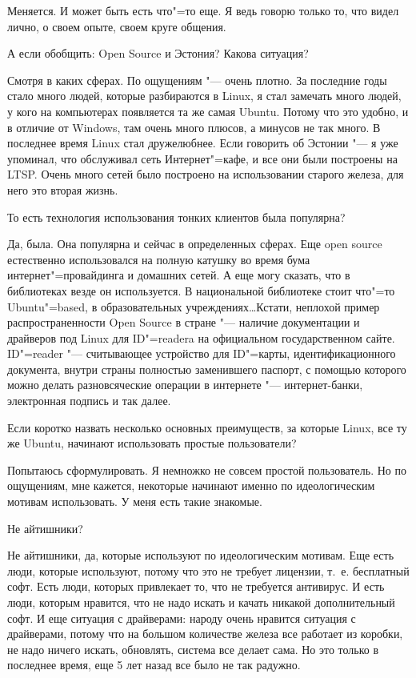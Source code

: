 \documentclass[10pt, a5paper]{article}
\begin{document}
\a Меняется. И может быть есть что"=то еще. Я ведь говорю только то, что видел лично, о своем опыте, своем круге общения.

\q А если обобщить: Open Source и Эстония? Какова ситуация?

\a Смотря в каких сферах. По ощущениям "--- очень плотно. За последние годы стало много людей, которые разбираются в Linux, я стал замечать много людей, у кого на компьютерах появляется та же самая Ubuntu. Потому что это удобно, и в отличие от Windows, там очень много плюсов, а минусов не так много. В последнее время Linux стал дружелюбнее. Если говорить об Эстонии "--- я уже упоминал, что обслуживал сеть Интернет"=кафе, и все они были построены на LTSP. Очень много сетей было построено на использовании старого железа, для него это вторая жизнь. 

\q То есть технология использования тонких клиентов была популярна?

\a Да, была. Она популярна и сейчас в определенных сферах. Еще open source естественно использовался на полную катушку во время бума интернет"=провайдинга и домашних сетей. А еще могу сказать, что в библиотеках везде он используется. В национальной библиотеке стоит что"=то Ubuntu"=based, в образовательных учреждениях\ldots Кстати, неплохой пример распространенности Open Source в стране "--- наличие документации и драйверов под Linux для ID"=readera на официальном государственном сайте. ID"=reader "--- считывающее устройство для ID"=карты, идентификационного документа, внутри страны полностью заменившего паспорт, с помощью которого можно делать разновсяческие операции в интернете "--- интернет-банки, электронная подпись и так далее.

\q Если коротко назвать несколько основных преимуществ, за которые Linux, все ту же Ubuntu, начинают использовать простые пользователи?

\a Попытаюсь сформулировать. Я немножко не совсем простой пользователь. Но по ощущениям, мне кажется, некоторые начинают именно по идеологическим мотивам использовать. У меня есть такие знакомые.

\q Не айтишники?

\a Не айтишники, да, которые используют по идеологическим мотивам. Еще есть люди, которые используют, потому что это не требует лицензии, т.~е. бесплатный софт. Есть люди, которых привлекает то, что не требуется антивирус. И есть люди, которым нравится, что не надо искать и качать никакой дополнительный софт. И еще ситуация с драйверами: народу очень нравится ситуация с драйверами, потому что на большом количестве железа все работает из коробки, не надо ничего искать, обновлять, система все делает сама. Но это только в последнее время, еще 5 лет назад все было не так радужно.
\end{document}
